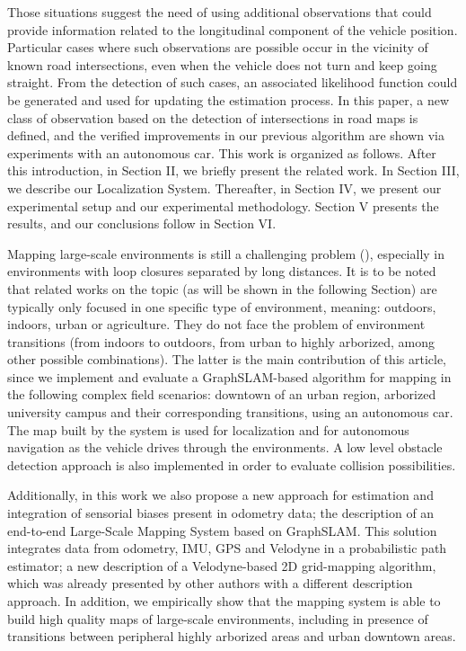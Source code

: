 Those situations suggest the need of using additional observations that could provide information related to the longitudinal component of the vehicle position. Particular cases where such observations are possible occur in the vicinity of known road intersections, even when the vehicle does not turn and keep going straight. From the detection of such cases, an associated likelihood function could be generated and used for updating the estimation process. In this paper, a new class of observation based on the detection of intersections in road maps is defined, and the verified improvements in our previous algorithm \cite{guivant2007global} are shown via experiments with an autonomous car.
This work is organized as follows. After this introduction, in Section II, we briefly present the related work. In Section III, we describe our Localization System. Thereafter, in Section IV, we present our experimental setup and our experimental methodology. Section V presents the results, and our conclusions follow in Section VI.


Mapping large-scale environments is still a challenging problem (\cite{60kummerle2009autonomous,61sunderhauf2012switchable,68mcdonald2013real}), especially in environments with loop closures separated by long distances. It is to be noted that related works on the topic (as will be shown in the following Section) are typically only focused in one specific type of environment, meaning: outdoors, indoors, urban or agriculture. They do not face the problem of environment transitions (from indoors to outdoors, from urban to highly arborized, among other possible combinations). The latter is the main contribution of this article, since we implement and evaluate a GraphSLAM-based algorithm for mapping in the following complex field scenarios: downtown of an urban region, arborized university campus and their corresponding transitions, using an autonomous car. The map built by the system is used for localization and for autonomous navigation as the vehicle drives through the environments. A low level obstacle detection approach is also implemented in order to evaluate collision possibilities.

Additionally, in this work we also propose a new approach for estimation and integration of sensorial biases present in odometry data; the description of an end-to-end Large-Scale Mapping System based on GraphSLAM. This solution integrates data from odometry, IMU, GPS and Velodyne in a probabilistic path estimator; a new description of a Velodyne-based 2D grid-mapping algorithm, which was already presented by other authors \cite{22montemerlo2008junior} with a different description approach. In addition, we empirically show that the mapping system is able to build high quality maps of large-scale environments, including in presence of transitions between peripheral highly arborized areas and urban downtown areas.

